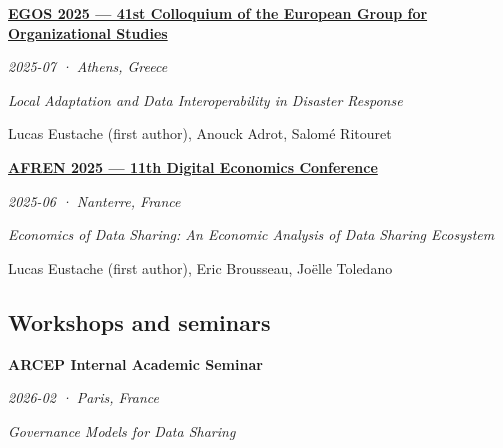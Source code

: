 \documentclass[11pt,a4paper]{article}
\newlength{\cvindent}
\newenvironment{cvblock}[1][1]{%
  \par\noindent\hspace*{#1\cvindent}%
  \begin{minipage}{\dimexpr\linewidth-#1\cvindent\relax}%
}{%
  \end{minipage}\par
}
\newenvironment{cvdetails}{%
  \begin{list}{}{%
    \setlength{\leftmargin}{\cvindent}%
    \setlength{\rightmargin}{0pt}%
    \setlength{\topsep}{0.1em}%
    \setlength{\partopsep}{0pt}%
    \setlength{\parsep}{0.05em}%
    \setlength{\itemsep}{0pt}%
  }\item[]\small\ignorespaces
}{%
  \end{list}
}
\begin{document}
\begin{cvblock}[2]
\textbf{\href{https://www.egos.org/jart/prj3/egos/main.jart?content-id=1721760205556&rel=de&reserve-mode=active&show_prog=yes&subtheme_id=1701434875423}{EGOS 2025 --- 41st Colloquium of the European Group for Organizational Studies}}\par
\begin{cvdetails}
{\small\itshape 2025-07 · Athens, Greece}\par
\textit{Local Adaptation and Data Interoperability in Disaster Response}\par
{\small Lucas Eustache (first author), Anouck Adrot, Salomé Ritouret}\par
\end{cvdetails}
\end{cvblock}\par\vspace{0.35em}

\begin{cvblock}[2]
\textbf{\href{https://economix.fr/uploads/source/doc/workshops/2025_11_eco_num/program.pdf}{AFREN 2025 --- 11th Digital Economics Conference}}\par
\begin{cvdetails}
{\small\itshape 2025-06 · Nanterre, France}\par
\textit{Economics of Data Sharing: An Economic Analysis of Data Sharing Ecosystem}\par
{\small Lucas Eustache (first author), Eric Brousseau, Joëlle Toledano}\par
\end{cvdetails}
\end{cvblock}\par\vspace{0.35em}

\subsection*{Workshops and seminars}
\begin{cvblock}[2]
\textbf{ARCEP Internal Academic Seminar}\par
\begin{cvdetails}
{\small\itshape 2026-02 · Paris, France}\par
\textit{Governance Models for Data Sharing}\par
\end{cvdetails}
\end{cvblock}\par\vspace{0.35em}
\end{document}
